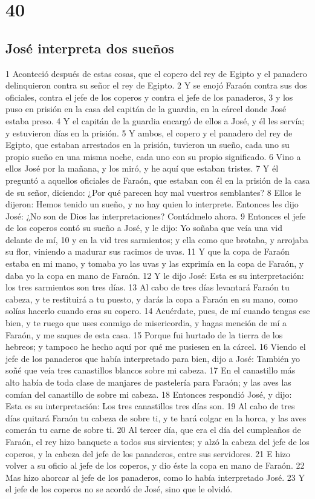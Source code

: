 \chapter{40}

\section*{José interpreta dos sueños}

1 Aconteció después de estas cosas, que el copero del rey de Egipto y el panadero delinquieron contra su señor el rey de Egipto.
2 Y se enojó Faraón contra sus dos oficiales, contra el jefe de los coperos y contra el jefe de los panaderos,
3 y los puso en prisión en la casa del capitán de la guardia, en la cárcel donde José estaba preso.
4 Y el capitán de la guardia encargó de ellos a José, y él les servía; y estuvieron días en la prisión.
5 Y ambos, el copero y el panadero del rey de Egipto, que estaban arrestados en la prisión, tuvieron un sueño, cada uno su propio sueño en una misma noche, cada uno con su propio significado.
6 Vino a ellos José por la mañana, y los miró, y he aquí que estaban tristes.
7 Y él preguntó a aquellos oficiales de Faraón, que estaban con él en la prisión de la casa de su señor, diciendo: ¿Por qué parecen hoy mal vuestros semblantes?
8 Ellos le dijeron: Hemos tenido un sueño, y no hay quien lo interprete. Entonces les dijo José: ¿No son de Dios las interpretaciones? Contádmelo ahora.
9 Entonces el jefe de los coperos contó su sueño a José, y le dijo: Yo soñaba que veía una vid delante de mí,
10 y en la vid tres sarmientos; y ella como que brotaba, y arrojaba su flor, viniendo a madurar sus racimos de uvas.
11 Y que la copa de Faraón estaba en mi mano, y tomaba yo las uvas y las exprimía en la copa de Faraón, y daba yo la copa en mano de Faraón.
12 Y le dijo José: Esta es su interpretación: los tres sarmientos son tres días.
13 Al cabo de tres días levantará Faraón tu cabeza, y te restituirá a tu puesto, y darás la copa a Faraón en su mano, como solías hacerlo cuando eras su copero.
14 Acuérdate, pues, de mí cuando tengas ese bien, y te ruego que uses conmigo de misericordia, y hagas mención de mí a Faraón, y me saques de esta casa.
15 Porque fui hurtado de la tierra de los hebreos; y tampoco he hecho aquí por qué me pusiesen en la cárcel.
16 Viendo el jefe de los panaderos que había interpretado para bien, dijo a José: También yo soñé que veía tres canastillos blancos sobre mi cabeza.
17 En el canastillo más alto había de toda clase de manjares de pastelería para Faraón; y las aves las comían del canastillo de sobre mi cabeza.
18 Entonces respondió José, y dijo: Esta es su interpretación: Los tres canastillos tres días son.
19 Al cabo de tres días quitará Faraón tu cabeza de sobre ti, y te hará colgar en la horca, y las aves comerán tu carne de sobre ti.
20 Al tercer día, que era el día del cumpleaños de Faraón, el rey hizo banquete a todos sus sirvientes; y alzó la cabeza del jefe de los coperos, y la cabeza del jefe de los panaderos, entre sus servidores.
21 E hizo volver a su oficio al jefe de los coperos, y dio éste la copa en mano de Faraón.
22 Mas hizo ahorcar al jefe de los panaderos, como lo había interpretado José.
23 Y el jefe de los coperos no se acordó de José, sino que le olvidó.

